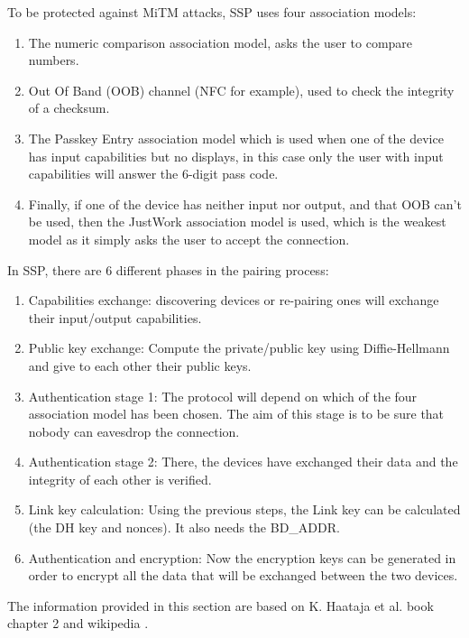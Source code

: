 \noindent To be protected against MiTM attacks, SSP uses four association models:
\begin{enumerate}
	\item The numeric comparison association model,  asks the user to compare numbers.
	\item Out Of Band (OOB) channel (NFC for example), used to check the integrity of a checksum.
	\item The Passkey Entry association model which is used when one of the device has input capabilities but no displays, in this case only the user with input capabilities will answer the 6-digit pass code.
	\item Finally, if one of the device has neither input nor output, and that OOB can't be used, then the JustWork association model is used, which is the weakest model as it simply asks the user to accept the connection.\\
\end{enumerate}
\noindent In SSP, there are 6 different phases in the pairing process:
\begin{enumerate}
	\item Capabilities exchange: discovering devices or re-pairing ones will exchange their input/output capabilities.
	\item Public key exchange: Compute the private/public key using Diffie-Hellmann and give to each other their public keys. 
	\item Authentication stage 1: The protocol will depend on which of the four association model has been chosen. The aim of this stage is to be sure that nobody can eavesdrop the connection. 
	\item Authentication stage 2: There, the devices have exchanged their data and the integrity of each other is verified.
	\item Link key calculation: Using the previous steps, the Link key can be calculated (the DH key and nonces). It also needs the BD\_ADDR.
	\item Authentication and encryption: Now the encryption keys can be generated in order to encrypt all the data that will be exchanged between the two devices. \\
\end{enumerate}

\noindent The information provided in this section are based on K. Haataja et al. book chapter 2 \cite{btsecoverview} and wikipedia \cite{btwiki}.

\newpage
